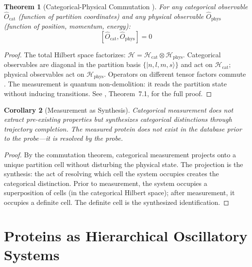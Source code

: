 \documentclass[11pt,twocolumn,a4paper]{article}
\newtheorem{theorem}{Theorem}[section]
\newtheorem{corollary}[theorem]{Corollary}
\theoremstyle{definition}
\theoremstyle{remark}
\newcommand{\Hilbert}{\mathcal{H}}
\newcommand{\Ocat}{\hat{O}_{\mathrm{cat}}}
\newcommand{\Ophys}{\hat{O}_{\mathrm{phys}}}
\begin{document}
\begin{theorem}[Categorical-Physical Commutation {\citep{sachikonye2025b}}]
\label{thm:commutation}
For any categorical observable $\Ocat$ (function of partition coordinates) and any physical observable $\Ophys$ (function of position, momentum, energy):
\begin{equation}
\boxed{[\Ocat, \Ophys] = 0}
\label{eq:commutation}
\end{equation}
\end{theorem}

\begin{proof}
The total Hilbert space factorizes: $\Hilbert = \Hilbert_{\mathrm{cat}} \otimes \Hilbert_{\mathrm{phys}}$. Categorical observables are diagonal in the partition basis $\{|n,l,m,s\rangle\}$ and act on $\Hilbert_{\mathrm{cat}}$; physical observables act on $\Hilbert_{\mathrm{phys}}$. Operators on different tensor factors commute \citep{sakurai2017}. The measurement is quantum non-demolition: it reads the partition state without inducing transitions. See \citet{sachikonye2025b}, Theorem~7.1, for the full proof.
\end{proof}

\begin{corollary}[Measurement as Synthesis]
\label{cor:synthesis}
Categorical measurement does not extract pre-existing properties but synthesizes categorical distinctions through trajectory completion. The measured protein does not exist in the database prior to the probe---it is resolved by the probe.
\end{corollary}

\begin{proof}
By the commutation theorem, categorical measurement projects onto a unique partition cell without disturbing the physical state. The projection is the synthesis: the act of resolving which cell the system occupies creates the categorical distinction. Prior to measurement, the system occupies a superposition of cells (in the categorical Hilbert space); after measurement, it occupies a definite cell. The definite cell is the synthesized identification.
\end{proof}


\part{Proteins as Hierarchical Oscillatory Systems}
\end{document}
